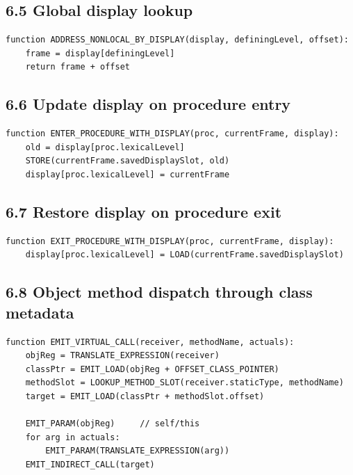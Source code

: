\documentclass[10pt,letterpaper]{article}
\begin{document}
\subsection*{6.5 Global display lookup}
{}

\begin{verbatim}
function ADDRESS_NONLOCAL_BY_DISPLAY(display, definingLevel, offset):
    frame = display[definingLevel]
    return frame + offset
\end{verbatim}

\subsection*{6.6 Update display on procedure entry}
{}

\begin{verbatim}
function ENTER_PROCEDURE_WITH_DISPLAY(proc, currentFrame, display):
    old = display[proc.lexicalLevel]
    STORE(currentFrame.savedDisplaySlot, old)
    display[proc.lexicalLevel] = currentFrame
\end{verbatim}

\subsection*{6.7 Restore display on procedure exit}
{}

\begin{verbatim}
function EXIT_PROCEDURE_WITH_DISPLAY(proc, currentFrame, display):
    display[proc.lexicalLevel] = LOAD(currentFrame.savedDisplaySlot)
\end{verbatim}

\subsection*{6.8 Object method dispatch through class metadata}
{}

\begin{verbatim}
function EMIT_VIRTUAL_CALL(receiver, methodName, actuals):
    objReg = TRANSLATE_EXPRESSION(receiver)
    classPtr = EMIT_LOAD(objReg + OFFSET_CLASS_POINTER)
    methodSlot = LOOKUP_METHOD_SLOT(receiver.staticType, methodName)
    target = EMIT_LOAD(classPtr + methodSlot.offset)

    EMIT_PARAM(objReg)     // self/this
    for arg in actuals:
        EMIT_PARAM(TRANSLATE_EXPRESSION(arg))
    EMIT_INDIRECT_CALL(target)
\end{verbatim}
\end{document}

